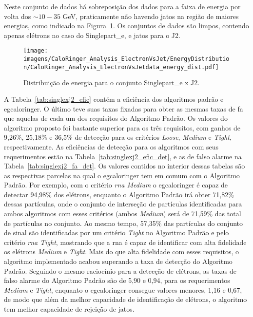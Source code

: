 Neste conjunto de dados há sobreposição dos dados para a faixa de energia por
volta dos $\sim10-35$ GeV, praticamente não havendo jatos na região de maiores
energias, como indicado na Figura~\ref{fig:singlexj2_distenergia}. Os conjuntos de
dados são limpos, contendo apenas elétrons no caso do Singlepart\_e, e jatos
para o J2.

\begin{figure}[ht]
\centering
\texttt{[image: imagens/CaloRinger\_Analysis\_ElectronVsJet/EnergyDistribution/CaloRinger\_Analysis\_ElectronVsJetdata\_energy\_dist.pdf]}
\label{fig:singlexj2_distenergia}
\caption{Distribuição de energia para o conjunto Singlepart\_e x J2.}
\end{figure}

A Tabela~\ref{tab:singlexj2_efic} contém a eficiência dos algoritmos padrão e
\gls{egcaloringer}. O último teve suas taxas fixadas para obter as mesmas taxas
de \gls{fa} que aquelas de cada um dos requisitos do Algoritmo Padrão. Os
valores do algoritmo proposto foi bastante superior para os três requisitos, com
ganhos de 9,26\%, 25,18\% e 36,5\% de detecção para os critérios \emph{Loose},
\emph{Medium} e \emph{Tight}, respectivamente. As eficiências de
detecção para os algoritmos com seus requerimentos estão na
Tabela~\ref{tab:singlexj2_efic_det}, e as de falso alarme
na Tabela~\ref{tab:singlexj2_fa_det}. Os valores contidos no interior dessas
tabelas são as respectivas parcelas na qual o \gls{egcaloringer} tem em comum
com o Algoritmo Padrão. Por exemplo, com o critério \emph{\gls{rna} Medium} o
\gls{egcaloringer} é capaz de detectar 94,98\% dos elétrons, enquanto o
Algoritmo Padrão irá obter 71,82\% dessas partículas, onde o conjunto de
interseção de partículas identificadas para ambos algoritmos com esses critérios
(ambos \emph{Medium}) será de 71,59\% das total de partículas no conjunto. Ao
mesmo tempo, 57,35\% das partículas do conjunto de sinal são identificadas por um critério
\emph{Tight} no Algoritmo Padrão e pelo critério \emph{\gls{rna} Tight},
mostrando que a \gls{rna} é capaz de identificar com alta fidelidade os elétrons
\emph{Medium} e \emph{Tight}. Mais do que alta fidelidade com esses requisitos,
o algoritmo implementado acabou superando a taxa de detecção do Algoritmo
Padrão. Seguindo o mesmo raciocínio para a detecção de elétrons, as taxas de falso
alarme do Algoritmo Padrão são de 5,90 e 0,94, para os requerimentos \emph{Medium}
e \emph{Tight}, enquanto o \gls{egcaloringer} consegue valores menores, 1,16 e
0,67, de modo que além da melhor capacidade de identificação de elétrons, o
algoritmo tem melhor capacidade de rejeição de jatos.

